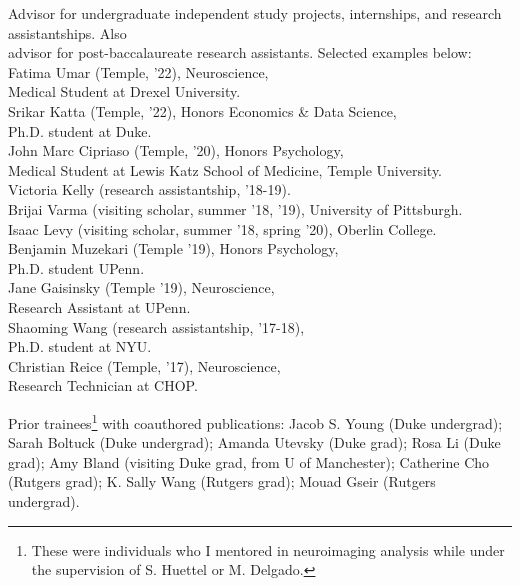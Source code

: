 \documentclass[11pt, letterpaper]{article}
\begin{document}
\begin{tabbing}
Advisor for undergraduate independent study projects, internships, and research assistantships. Also \\
\> advisor for post-baccalaureate research assistants. Selected examples below: \\  [.1cm]

\> Fatima Umar (Temple, '22), Neuroscience, \\
\> \> Medical Student at Drexel University. \\
\> Srikar Katta (Temple, '22), Honors Economics \& Data Science, \\
\> \> Ph.D. student at Duke. \\
\> John Marc Cipriaso (Temple, '20), Honors Psychology, \\
\> \> Medical Student at Lewis Katz School of Medicine, Temple University. \\
\> Victoria Kelly (research assistantship, '18-19). \\
\> Brijai Varma (visiting scholar, summer '18, '19), University of Pittsburgh. \\
\> Isaac Levy (visiting scholar, summer '18, spring '20), Oberlin College. \\
\> Benjamin Muzekari (Temple '19), Honors Psychology, \\
\> \> Ph.D. student UPenn. \\
\> Jane Gaisinsky (Temple '19), Neuroscience, \\
\> \> Research Assistant at UPenn. \\
\> Shaoming Wang (research assistantship, '17-18), \\
\> \> Ph.D. student at NYU. \\
\> Christian Reice (Temple, '17), Neuroscience, \\
\> \> Research Technician at CHOP.

\end{tabbing}

\begin{hangparas}{.5in}{1}
Prior trainees\footnote{These were individuals who I mentored in neuroimaging analysis while under the supervision of S. Huettel or M. Delgado.} with coauthored publications: Jacob S. Young (Duke undergrad); Sarah Boltuck (Duke undergrad); Amanda Utevsky (Duke grad); Rosa Li (Duke grad); Amy Bland (visiting Duke grad, from U of Manchester); Catherine Cho (Rutgers grad); K. Sally Wang (Rutgers grad); Mouad Gseir (Rutgers undergrad).
\end{hangparas}
\end{document}
